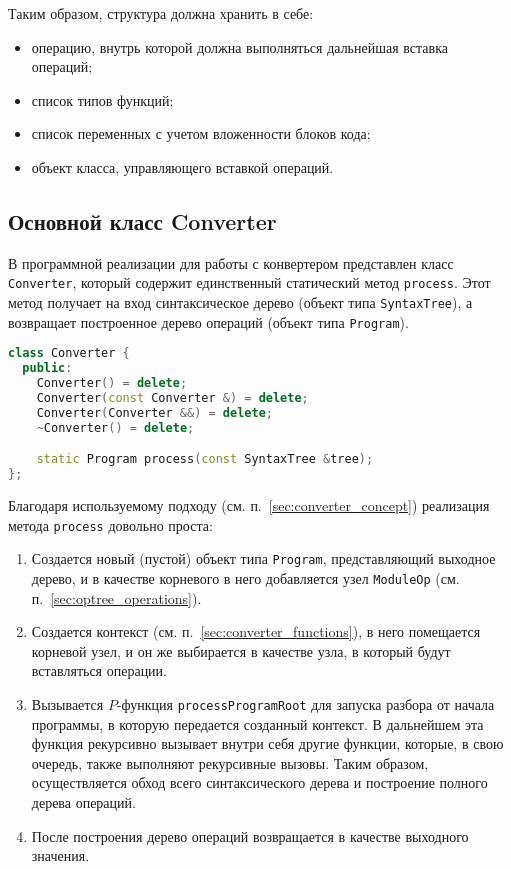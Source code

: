 
Таким образом, структура должна хранить в себе:

\begin{itemize}
    \item операцию, внутрь которой должна выполняться дальнейшая вставка операций;
    \item список типов функций;
    \item список переменных с учетом вложенности блоков кода;
    \item объект класса, управляющего вставкой операций.
\end{itemize}

\subsection{Основной класс Converter}
\label{sec:converter_class}

В программной реализации для работы с конвертером представлен класс \verb|Converter|, который содержит единственный статический метод \verb|process|.
Этот метод получает на вход синтаксическое дерево (объект типа \verb|SyntaxTree|), а возвращает построенное дерево операций (объект типа \verb|Program|).

\begin{lstlisting}[language=C++, caption=Объявление класса Converter]
class Converter {
  public:
    Converter() = delete;
    Converter(const Converter &) = delete;
    Converter(Converter &&) = delete;
    ~Converter() = delete;

    static Program process(const SyntaxTree &tree);
};
\end{lstlisting}

Благодаря используемому подходу (см. п.~\ref{sec:converter_concept}) реализация метода \verb|process| довольно проста:

\begin{enumerate}
    \item Создается новый (пустой) объект типа \verb|Program|, представляющий выходное дерево, и в качестве корневого в него добавляется узел \verb|ModuleOp| (см. п.~\ref{sec:optree_operations}).
    \item Создается контекст (см. п.~\ref{sec:converter_functions}), в него помещается корневой узел, и он же выбирается в качестве узла, в который будут вставляться операции.
    \item Вызывается \(P\)-функция \verb|processProgramRoot| для запуска разбора от начала программы, в которую передается созданный контекст.
          В дальнейшем эта функция рекурсивно вызывает внутри себя другие функции, которые, в свою очередь, также выполняют рекурсивные вызовы.
          Таким образом, осуществляется обход всего синтаксического дерева и построение полного дерева операций.
    \item После построения дерево операций возвращается в качестве выходного значения.
\end{enumerate}

